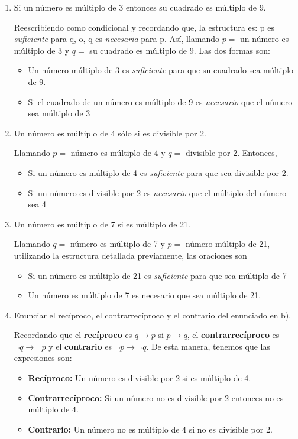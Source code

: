 \begin{enumerate}
	\item Si un número es múltiplo de 3 entonces su cuadrado es múltiplo de 9. 
	
	Reescribiendo como condicional y recordando que, la estructura es: p es \textit{suficiente} para q, o, q es \textit{necesaria} para p. As\'i, llamando $p =$ un n\'umero es m\'ultiplo de 3 y $q = $ su cuadrado es m\'ultiplo de 9. Las dos formas son:
	\begin{itemize}
		\item Un n\'umero m\'ultiplo de 3 es \textit{suficiente} para que su cuadrado sea m\'ultiplo de 9.
		\item Si el cuadrado de un n\'umero es m\'ultiplo de 9 es \textit{necesario} que el n\'umero sea m\'ultiplo de 3
	\end{itemize}

	\item Un número es múltiplo de 4 sólo si es divisible por 2.
	
	Llamando $p =$ n\'umero es m\'ultiplo de 4 y $q =$ divisible por 2. Entonces,
	\begin{itemize}
		\item Si un n\'umero es m\'ultiplo de 4 es \textit{suficiente} para que sea divisible por 2.
		\item Si un n\'umero es divisible por 2 es \textit{necesario} que el m\'ultiplo del n\'umero sea 4
	\end{itemize}

	\item Un número es múltiplo de 7 si es múltiplo de 21.
	
	Llamando $q =$ n\'umero es m\'ultiplo de 7 y $p =$ n\'umero m\'ultiplo de 21, utilizando la estructura detallada previamente, las oraciones son
	\begin{itemize}
		\item Si un n\'umero es m\'ultiplo de 21 es \textit{suficiente} para que sea m\'ultiplo de 7
		\item Un n\'umero es m\'ultiplo de 7 es necesario que sea m\'ultiplo de 21.
	\end{itemize}

	\item Enunciar el recíproco, el contrarrecíproco y el contrario del enunciado en b).
	
	Recordando que el \textbf{rec\'iproco} es $q \rightarrow p$ si $p \rightarrow q$, el \textbf{contrarrec\'iproco} es $\neg q \rightarrow \neg p$ y el \textbf{contrario} es $\neg p \rightarrow \neg q$. De esta manera, tenemos que las expresiones son:
	\begin{itemize}
		\item \textbf{Rec\'iproco:} Un n\'umero es divisible por 2 si es m\'ultiplo de 4.
		\item \textbf{Contrarrec\'iproco:} Si un n\'umero no es divisible por 2 entonces no es m\'ultiplo de 4.
		\item \textbf{Contrario:} Un n\'umero no es m\'ultiplo de 4 si no es divisible por 2.
	\end{itemize}
\end{enumerate}

